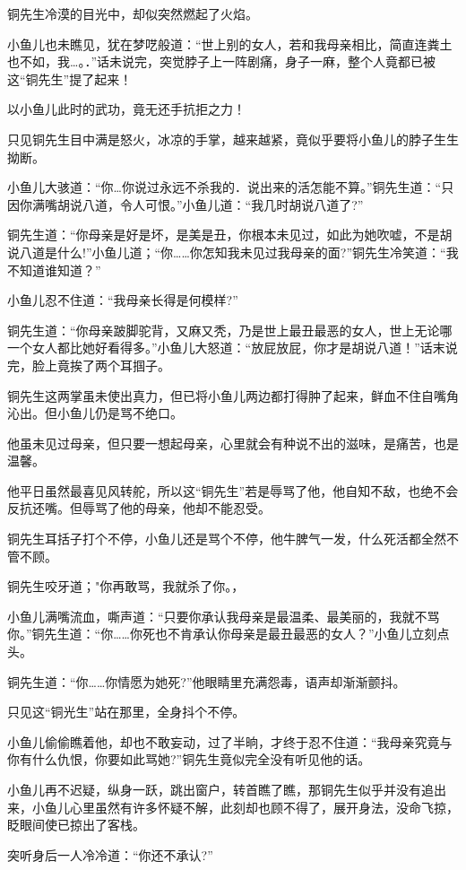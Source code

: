 \documentclass[12pt,oneside]{book}
\begin{document}
铜先生冷漠的目光中，却似突然燃起了火焰。

小鱼儿也未瞧见，犹在梦呓般道：``世上别的女人，若和我母亲相比，简直连粪土也不如，我\ldots。．''话未说完，突觉脖子上一阵剧痛，身子一麻，整个人竟都已被这``铜先生''提了起来！

以小鱼儿此时的武功，竟无还手抗拒之力！

只见铜先生目中满是怒火，冰凉的手掌，越来越紧，竟似乎要将小鱼儿的脖子生生拗断。

小鱼儿大骇道：``你\ldots 你说过永远不杀我的．说出来的活怎能不算。''铜先生道：``只因你满嘴胡说八道，令人可恨。''小鱼儿道：``我几时胡说八道了?''

铜先生道：``你母亲是好是坏，是美是丑，你根本未见过，如此为她吹嘘，不是胡说八道是什么!''小鱼儿道；``你\ldots\ldots 你怎知我未见过我母亲的面?''铜先生冷笑道：``我不知道谁知道？''

小鱼儿忍不住道：``我母亲长得是何模样?''

铜先生道：``你母亲跛脚驼背，又麻又秃，乃是世上最丑最恶的女人，世上无论哪一个女人都比她好看得多。''小鱼儿大怒道：``放屁放屁，你才是胡说八道！''话末说完，脸上竟挨了两个耳掴子。

铜先生这两掌虽未使出真力，但已将小鱼儿两边都打得肿了起来，鲜血不住自嘴角沁出。但小鱼儿仍是骂不绝口。

他虽未见过母亲，但只要一想起母亲，心里就会有种说不出的滋味，是痛苦，也是温馨。

他平日虽然最喜见风转舵，所以这``铜先生''若是辱骂了他，他自知不敌，也绝不会反抗还嘴。但辱骂了他的母亲，他却不能忍受。

铜先生耳括子打个不停，小鱼儿还是骂个不停，他牛脾气一发，什么死活都全然不管不顾。

铜先生咬牙道；"你再敢骂，我就杀了你。，

小鱼儿满嘴流血，嘶声道：``只要你承认我母亲是最温柔、最美丽的，我就不骂你。''铜先生道：``你\ldots\ldots 你死也不肯承认你母亲是最丑最恶的女人？''小鱼儿立刻点头。

铜先生道：``你\ldots\ldots 你情愿为她死?''他眼睛里充满怨毒，语声却渐渐颤抖。

只见这``铜光生''站在那里，全身抖个不停。

小鱼儿偷偷瞧着他，却也不敢妄动，过了半晌，才终于忍不住道：``我母亲究竟与你有什么仇恨，你要如此骂她?''铜先生竟似完全没有听见他的话。

小鱼儿再不迟疑，纵身一跃，跳出窗户，转首瞧了瞧，那铜先生似乎并没有追出来，小鱼儿心里虽然有许多怀疑不解，此刻却也顾不得了，展开身法，没命飞掠，眨眼间使已掠出了客栈。

突听身后一人冷冷道：``你还不承认?''
\end{document}
